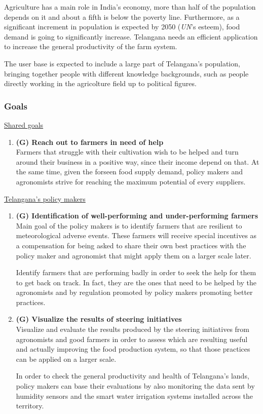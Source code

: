 \documentclass[table, 12pt]{article}
\begin{document}
Agriculture has a main role in India's economy, more than half of the population depends on it and about a fifth is below the poverty line.
Furthermore, as a significant increment in population is expected by 2050 (\emph{UN}'s esteem), food demand is going to significantly increase.
Telangana needs an efficient application to increase the general productivity of the farm system.

The user base is expected to include a large part of Telangana's population, bringing together people with different knowledge backgrounds, such as people directly working in the agricolture field up to political figures.

\subsubsection{Goals}
\underline{Shared goals}
\begin{enumerate}
    \item  \textbf{(G) Reach out to farmers in need of help} \\ Farmers that struggle with their cultivation wish to be helped and turn around their business in a positive way, since their income depend on that. At the same time, given the forseen food supply demand, policy makers and agronomists strive for reaching the maximum potential of every suppliers.
\end{enumerate}
\underline{Telangana's policy makers}
\begin{enumerate}
    \item \textbf{(G) Identification of well-performing  and under-performing farmers}\\
    Main goal of the policy makers is to identify farmers that are resilient to meteorological adverse events.
    These farmers will receive special incentives as a compensation for being asked to share their own best practices with the policy maker and agronomist that might apply them on a larger scale later.

    Identify farmers that are performing badly in order to seek the help for them to get back on track. In fact, they are the ones that need to be helped by the agronomists and by regulation promoted by policy makers promoting better practices.
    \item \textbf{(G) Visualize the results of steering initiatives}\\
    Visualize and evaluate the results produced by the steering initiatives from agronomists and good farmers in order to assess which are resulting useful and actually improving the food production system, so that those practices can be applied on a larger scale. 
    
    In order to check the general productivity and health of Telangana's lands, policy makers can base their evaluations by also monitoring the data sent by humidity sensors and the smart water irrigation systems installed across the territory.
\end{enumerate}
\end{document}
